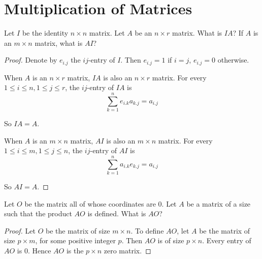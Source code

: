 \section{Multiplication of Matrices}
\setcounter{exercise}{0}

\begin{exercise}
    Let $I$ be the identity $n\times n$ matrix. Let $A$ be an $n\times r$ matrix. What is $IA$? If $A$ is an $m\times n$ matrix, what is $AI$?
\end{exercise}

\begin{proof}
    Denote by $e_{i.j}$ the $ij$-entry of $I$. Then $e_{i.j} = 1$ if $i = j$, $e_{i.j} = 0$ otherwise.

    When $A$ is an $n\times r$ matrix, $IA$ is also an $n\times r$ matrix. For every $1\le i\le n, 1\le j\le r$, the $ij$-entry of $IA$ is
    \[
        \sum^{n}_{k=1}e_{i.k}a_{k.j} = a_{i.j}
    \]

    So $IA = A$.

    When $A$ is an $m\times n$ matrix, $AI$ is also an $m\times n$ matrix. For every $1\le i\le m, 1\le j\le n$, the $ij$-entry of $AI$ is
    \[
        \sum^{n}_{k=1}a_{i.k}e_{k.j} = a_{i.j}
    \]

    So $AI = A$.
\end{proof}

\begin{exercise}
    Let $O$ be the matrix all of whose coordinates are $0$. Let $A$ be a matrix of a size such that the product $AO$ is defined. What is $AO$?
\end{exercise}

\begin{proof}
    Let $O$ be the matrix of size $m\times n$. To define $AO$, let $A$ be the matrix of size $p\times m$, for some positive integer $p$. Then $AO$ is of size $p\times n$. Every entry of $AO$ is $0$. Hence $AO$ is the $p\times n$ zero matrix.
\end{proof}

